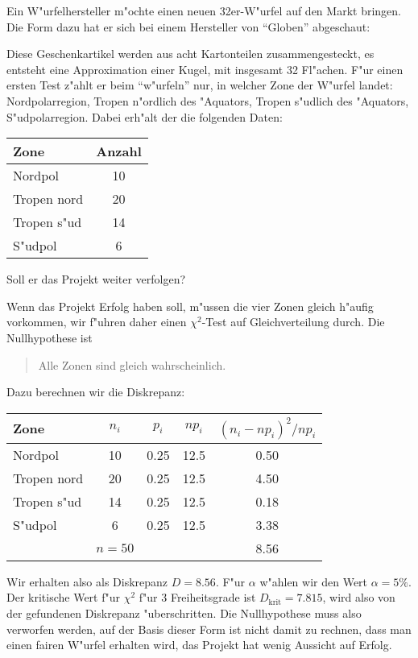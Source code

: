 Ein W"urfelhersteller m"ochte einen neuen 32er-W"urfel auf den Markt
bringen.
Die Form dazu hat er sich bei einem Hersteller von ``Globen'' abgeschaut: 
\begin{center}
\end{center}
Diese Geschenkartikel werden aus acht Kartonteilen zusammengesteckt, es
entsteht eine Approximation einer Kugel, mit insgesamt 32 Fl"achen.
F"ur einen ersten Test z"ahlt er beim ``w"urfeln'' nur, in welcher Zone
der W"urfel landet: Nordpolarregion, Tropen n"ordlich des "Aquators,
Tropen s"udlich des "Aquators, S"udpolarregion.
Dabei erh"alt der die folgenden Daten:
\begin{center}
\begin{tabular}{|l|c|}
\hline
Zone       &Anzahl\\
\hline
Nordpol    & 10\\
Tropen nord& 20\\
Tropen s"ud& 14\\
S"udpol    & 6\\
\hline
\end{tabular}
\end{center}
Soll er das Projekt weiter verfolgen?


\begin{loesung}
Wenn das Projekt Erfolg haben soll, m"ussen die vier Zonen gleich h"aufig
vorkommen, wir f"uhren daher einen $\chi^2$-Test auf Gleichverteilung
durch.
Die Nullhypothese ist
\begin{quote}
Alle Zonen sind gleich wahrscheinlich.
\end{quote}
Dazu berechnen wir die Diskrepanz:
\begin{center}
\begin{tabular}{|l|c|c|c|c|}
\hline
Zone       & $n_i$ & $p_i$ & $np_i$ & $(n_i-np_i)^2/np_i$ \\
\hline
Nordpol    &  10   & 0.25  & 12.5   & 0.50 \\
Tropen nord&  20   & 0.25  & 12.5   & 4.50 \\
Tropen s"ud&  14   & 0.25  & 12.5   & 0.18 \\
S"udpol    &   6   & 0.25  & 12.5   & 3.38 \\
\hline
           &$n=50$ &       &        & 8.56 \\
\hline
\end{tabular}
\end{center}
Wir erhalten also als Diskrepanz $D=8.56$.
F"ur $\alpha$ w"ahlen wir den Wert $\alpha=5\%$.
Der kritische Wert f"ur $\chi^2$ f"ur 3 Freiheitsgrade ist 
$D_{\text{krit}}=7.815$, wird also von der gefundenen Diskrepanz
"uberschritten.
Die Nullhypothese muss also verworfen werden, auf der Basis dieser
Form ist nicht damit zu rechnen, dass man einen fairen W"urfel
erhalten wird, das Projekt hat wenig Aussicht auf Erfolg.
\end{loesung}

